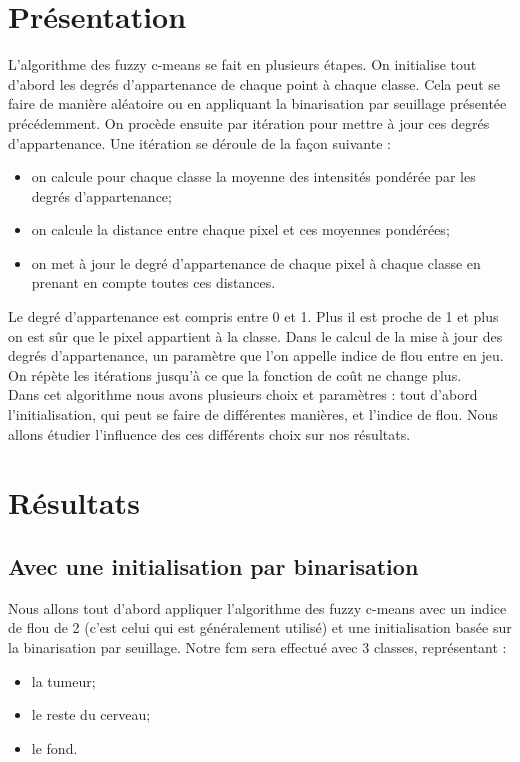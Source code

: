 \section{Présentation}
	L'algorithme des fuzzy c-means se fait en plusieurs étapes. On initialise tout d'abord les degrés d'appartenance de chaque point à chaque classe. Cela peut se faire de manière aléatoire ou en appliquant la binarisation par seuillage présentée précédemment. On procède ensuite par itération pour mettre à jour ces degrés d'appartenance. Une itération se déroule de la façon suivante :\\

	\begin{itemize}
		\item on calcule pour chaque classe la moyenne des intensités pondérée par les degrés d'appartenance;
		\item on calcule la distance entre chaque pixel et ces moyennes pondérées;
		\item on met à jour le degré d'appartenance de chaque pixel à chaque classe en prenant en compte toutes ces distances.
	\end{itemize}
	\bigskip

	Le degré d'appartenance est compris entre 0 et 1. Plus il est proche de 1 et plus on est sûr que le pixel appartient à la classe. Dans le calcul de la mise à jour des degrés d'appartenance, un paramètre que l'on appelle indice de flou entre en jeu. On répète les itérations jusqu'à ce que la fonction de coût ne change plus.\\

	Dans cet algorithme nous avons plusieurs choix et paramètres : tout d'abord l'initialisation, qui peut se faire de différentes manières, et l'indice de flou. Nous allons étudier l'influence des ces différents choix sur nos résultats.

\section{Résultats}

	\subsection{Avec une initialisation par binarisation} %
	\label{ssub:avec_une_initialisation_par_binarisation}
		Nous allons tout d'abord appliquer l'algorithme des fuzzy c-means avec un indice de flou de 2 (c'est celui qui est généralement utilisé) et une initialisation basée sur la binarisation par seuillage. Notre fcm sera effectué avec 3 classes, représentant :
		\begin{itemize}
			\item la tumeur;
			\item le reste du cerveau;
			\item le fond.
		\end{itemize}

